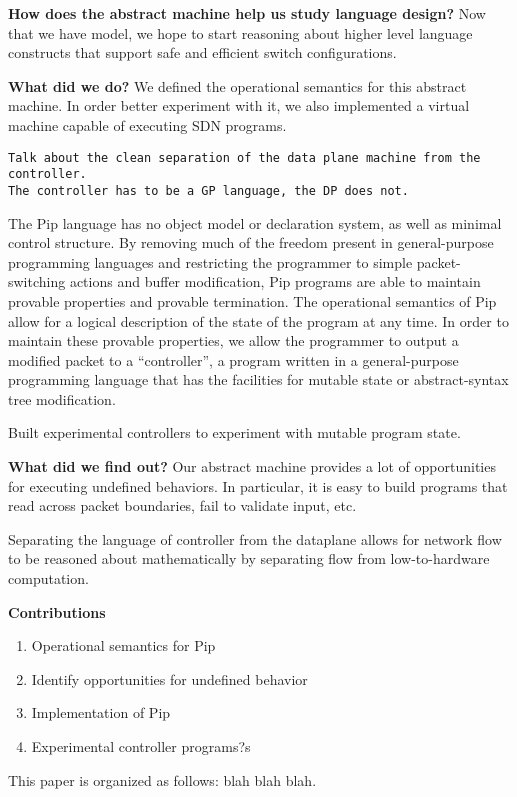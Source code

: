 \textbf{How does the abstract machine help us study language design?}
Now that we have model, we hope to start reasoning about higher level language constructs that support safe and efficient switch configurations. 

\textbf{What did we do?}
We defined the operational semantics for this abstract machine. In order better experiment with it, we also implemented a virtual machine capable of executing SDN programs.

\begin{verbatim}
Talk about the clean separation of the data plane machine from the controller.
The controller has to be a GP language, the DP does not.
\end{verbatim}
The Pip language has no object model or declaration system, as well as minimal control structure. By removing much of the freedom present in general-purpose programming languages and restricting the programmer to simple packet-switching actions and buffer modification, Pip programs are able to maintain provable properties and provable termination. The operational semantics of Pip allow for a logical description of the state of the program at any time. In order to maintain these provable properties, we allow the programmer to output a modified packet to a ``controller'', a program written in a general-purpose programming language that has the facilities for mutable state or abstract-syntax tree modification.

Built experimental controllers to experiment with mutable program state.

\textbf{What did we find out?}
Our abstract machine provides a lot of opportunities for executing undefined behaviors. In particular, it is easy to build programs that read across packet boundaries, fail to validate input, etc. 

Separating the language of controller from the dataplane allows for network flow to be reasoned about mathematically by separating flow from low-to-hardware computation.

\textbf{Contributions}
\begin{enumerate}
\item Operational semantics for Pip
\item Identify opportunities for undefined behavior
\item Implementation of Pip
\item Experimental controller programs?s
\end{enumerate}


This paper is organized as follows: blah blah blah.
